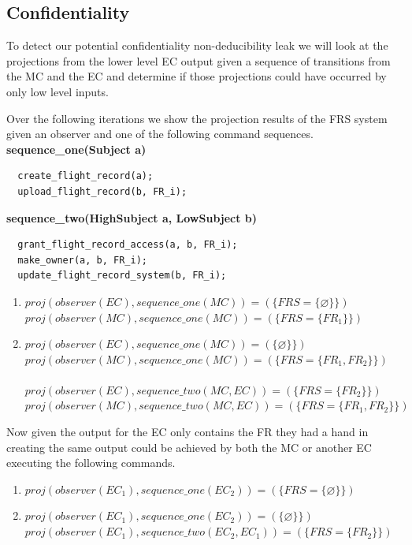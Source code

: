 \documentclass[10pt,journal,compsoc]{IEEEtran}
\begin{document}
\subsection{Confidentiality}

To detect our potential confidentiality non-deducibility leak we will look at the projections from the lower level EC output given a sequence of transitions from the MC and the EC and determine if those projections could have occurred by only low level inputs.

Over the following iterations we show the projection results of the FRS system given an observer and one of the following command sequences. \\

\textbf{sequence\_one(Subject a)}
\begin{lstlisting}
  create_flight_record(a);
  upload_flight_record(b, FR_i);
\end{lstlisting}  

\textbf{sequence\_two(HighSubject a, LowSubject b)}
\begin{lstlisting}
  grant_flight_record_access(a, b, FR_i);
  make_owner(a, b, FR_i);
  update_flight_record_system(b, FR_i);
\end{lstlisting}  
  
\begin{enumerate}
  \item $proj(observer (EC),sequence\_one(MC)) = (\{FRS = \{\varnothing\}\})$ \\
  $proj(observer (MC),sequence\_one(MC)) = (\{FRS = \{FR_1\}\})$ \\

  \item $proj(observer (EC),sequence\_one(MC)) = (\{\varnothing\}\})$ \\
  $proj(observer (MC),sequence\_one(MC)) = (\{FRS = \{FR_1, FR_2\}\})$ \\\\

  $proj(observer (EC),sequence\_two(MC, EC)) = (\{FRS = \{FR_2\}\})$ \\
  $proj(observer (MC),sequence\_two(MC, EC)) = (\{FRS = \{FR_1, FR_2\}\})$ \\
\end{enumerate}


Now given the output for the EC only contains the FR they had a hand in creating the same output could be achieved by both the MC or another EC executing the following commands. 

\begin{enumerate}
  \item $proj(observer (EC_1),sequence\_one(EC_2)) = (\{FRS = \{\varnothing\}\})$ \\
  \item $proj(observer (EC_1),sequence\_one(EC_2)) = (\{\varnothing\}\})$ \\
  $proj(observer (EC_1),sequence\_two(EC_2, EC_1)) = (\{FRS = \{FR_2\}\})$ \\
\end{enumerate}
\end{document}

